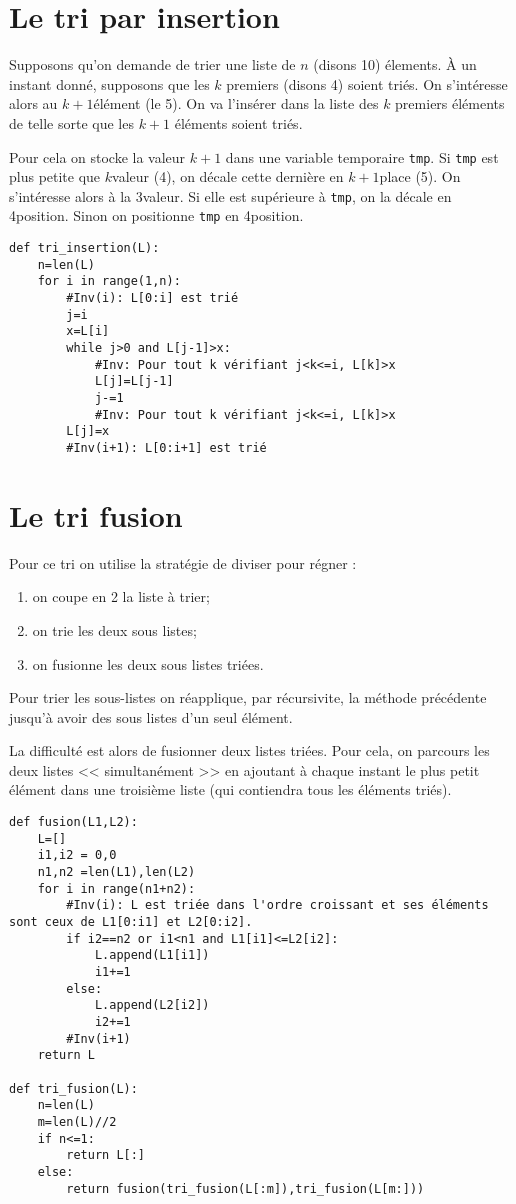 \section{Le tri par insertion}
Supposons qu'on demande de trier une liste de $n$ (disons 10) élements. À un instant donné, supposons que les $k$ premiers (disons 4) soient triés. On s'intéresse alors au $k+1$\ieme élément (le 5\ieme). On va l'insérer dans la liste des $k$ premiers éléments de telle sorte que les  $k+1$ éléments soient triés. 

Pour cela on stocke la valeur $k+1$ dans une variable temporaire \texttt{tmp}. Si \texttt{tmp} est plus petite que $k$\ieme valeur (4\ieme), on décale cette dernière en $k+1$\ieme place (5\ieme). On s'intéresse alors à la 3\ieme valeur. Si elle est supérieure à \texttt{tmp}, on la décale en 4\ieme position. Sinon on positionne \texttt{tmp} en 4\ieme position. 
\begin{lstlisting}	
def tri_insertion(L):
    n=len(L)
    for i in range(1,n):
        #Inv(i): L[0:i] est trié
        j=i
        x=L[i]
        while j>0 and L[j-1]>x:
            #Inv: Pour tout k vérifiant j<k<=i, L[k]>x
            L[j]=L[j-1]
            j-=1
            #Inv: Pour tout k vérifiant j<k<=i, L[k]>x
        L[j]=x
        #Inv(i+1): L[0:i+1] est trié
\end{lstlisting}	

\section{Le tri fusion}
Pour ce tri on utilise la stratégie de diviser pour régner : 
\begin{enumerate}
\item on coupe en 2 la liste à trier;
\item on trie les deux sous listes;
\item on fusionne les deux sous listes triées. 
\end{enumerate}
Pour trier les sous-listes on réapplique, par récursivite, la méthode précédente jusqu'à avoir des sous listes d'un seul élément. 

La difficulté est alors de fusionner deux listes triées. Pour cela, on parcours les deux listes << simultanément >> en ajoutant à chaque instant le plus petit élément dans une troisième liste (qui contiendra tous les éléments triés). 
\begin{lstlisting}	
def fusion(L1,L2):
    L=[]
    i1,i2 = 0,0
    n1,n2 =len(L1),len(L2)
    for i in range(n1+n2):
        #Inv(i): L est triée dans l'ordre croissant et ses éléments sont ceux de L1[0:i1] et L2[0:i2].
        if i2==n2 or i1<n1 and L1[i1]<=L2[i2]:
            L.append(L1[i1])
            i1+=1
        else:
            L.append(L2[i2])
            i2+=1
        #Inv(i+1)
    return L
    
def tri_fusion(L):
    n=len(L)
    m=len(L)//2
    if n<=1:
        return L[:]
    else:
        return fusion(tri_fusion(L[:m]),tri_fusion(L[m:]))
\end{lstlisting}	

